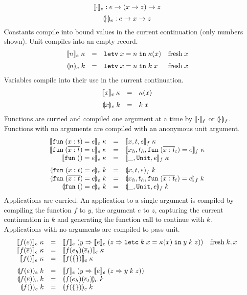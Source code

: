 \documentclass[11pt]{article}
\begin{document}
\[
    \llbracket \cdot \rrbracket_e : e -> (x -> z) -> z
\]
\[
    \llparenthesis \cdot \rrparenthesis_e : e -> x -> z
\]
Constants compile into bound values in the current continuation (only numbers shown).
Unit compiles into an empty record.
\[
\begin{array}{rcll}
\cmpk{e}{\nume{n}} & = &
  \letv{x}{n}{\kappa(x)}   & \fresh{x} \medskip \\

\tcmpk{e}{\nume{n}} & = &
  \letv{x}{n}{\appc{k}{x}} & \fresh{x} \\
\end{array}
\]
Variables compile into their use in the current continuation.
\[
\begin{array}{rcll}
\cmpk{e}{\vare{x}} & = &
  \kappa(x) \medskip \\

\tcmpk{e}{\vare{x}} & = &
  \appc{k}{x} \\
\end{array}
\]
Functions are curried and compiled one argument at a time by $\llbracket \cdot \rrbracket_f$ or $\llparenthesis \cdot \rrparenthesis_f$.
Functions with no arguments are compiled with an anonymous unit argument.
\[
\begin{array}{rcll}
\cmpk{e}{\fune{\arge{x}{t}}{e}} & = &
  \cmpk{f}{x,t,e}
  \\
\cmpk{e}{\fune{\repo{\arge{x}{t}}}{e}} & = &
  \cmpk{f}{x_h,t_h,\fune{\repo{\arge{x}{t}}_t}{e}}
  \\
\cmpk{e}{\fune{}{e}} & = &
  \cmpk{f}{\_,\unity,e} \medskip
  \\
\tcmpk{e}{\fune{\arge{x}{t}}{e}} & = &
  \tcmpk{f}{x,t,e}
  \\
\tcmpk{e}{\fune{\repo{\arge{x}{t}}}{e}} & = &
  \tcmpk{f}{x_h,t_h,\fune{\repo{\arge{x}{t}}_t}{e}}
  \\
\tcmpk{e}{\fune{}{e}} & = &
  \tcmpk{f}{\_,\unity,e}
  \\
\end{array}
\]
Applications are curried.
An application to a single argument is compiled by compiling the function $f$ to $y$, the argument $e$ to $z$, capturing the current continuation in $k$ and generating the function call to continue with $k$.
Applications with no arguments are compiled to pass unit.
\[
\begin{array}{rcll}
\cmpk{e}{\appe{f}{e}} & = &
  \cmpin{e}{f}{(y => \cmpin{e}{e}{(z => \letc{k}{x}{\kappa(x)}{\appf{y}{k}{z}})})} &
  \fresh{k,x} \\
\cmpk{e}{\appe{f}{\repo{e}}} & = &
  \cmpk{e}{\appe{\appe{f}{e_h}}{\repo{e}_t}} \\
\cmpk{e}{\appe{f}{}} & = &
  \cmpk{e}{\appe{f}{\unie}} \medskip
  \\
\tcmpk{e}{\appe{f}{e}} & = &
  \cmpin{e}{f}{(y => \cmpin{e}{e}{(z => \appf{y}{k}{z})})} \\
\tcmpk{e}{\appe{f}{\repo{e}}} & = &
  \tcmpk{e}{\appe{\appe{f}{e_h}}{\repo{e}_t}} \\
\tcmpk{e}{\appe{f}{}} & = &
  \tcmpk{e}{\appe{f}{\unie}}
\end{array}
\]
\end{document}
